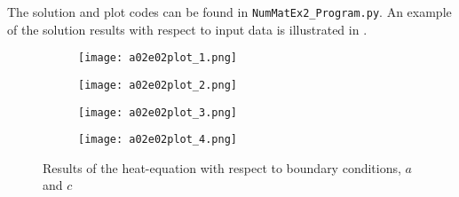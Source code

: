 %

%
The solution and plot codes can be found in \texttt{NumMatEx2\_Program.py}.
An example of the solution results with respect to input data is illustrated in .
%
\begin{figure}[H]
\vspace*{\FigUpperVSpace}
\def\MeshFigWidth{220pt}
	\begin{subfigure}{0.5\hsize}
		\centering
		\texttt{[image: a02e02plot\_1.png]} 
	\end{subfigure}
	\begin{subfigure}{0.5\hsize}
		\centering
		\texttt{[image: a02e02plot\_2.png]} 
	\end{subfigure}
	\vfill
	\begin{subfigure}{0.5\hsize}
		\centering
		\texttt{[image: a02e02plot\_3.png]} 
	\end{subfigure}
	\begin{subfigure}{0.5\hsize}
		\centering
		\texttt{[image: a02e02plot\_4.png]} 
	\end{subfigure}
	\caption{Results of the heat-equation with respect to boundary conditions, $a$ and $c$}
	\label{fig:a02e02plot}
\end{figure}